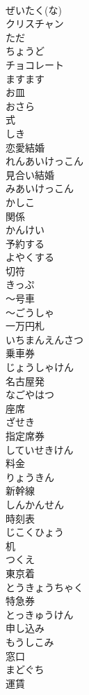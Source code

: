 \documentclass[8pt]{extreport}
\begin{document}
\begin{CJK}{UTF8}{min}
\\	ぜいたく(な)
\\	クリスチャン	
\\	ただ	
\\	ちょうど	
\\	チョコレート	
\\	ますます	
\\	お皿	
\\	おさら
\\	式	
\\	しき
\\	恋愛結婚	
\\	れんあいけっこん
\\	見合い結婚	
\\	みあいけっこん
\\	かしこ	
\\	関係	
\\	かんけい
\\	予約する	
\\	よやくする
\\	切符	
\\	きっぷ
\\	～号車	
\\	～ごうしゃ
\\	一万円札	
\\	いちまんえんさつ
\\	乗車券	
\\	じょうしゃけん
\\	名古屋発	
\\	なごやはつ
\\	座席	
\\	ざせき
\\	指定席券	
\\	していせきけん
\\	料金	
\\	りょうきん
\\	新幹線	
\\	しんかんせん
\\	時刻表	
\\	じこくひょう
\\	机	
\\	つくえ
\\	東京着	
\\	とうきょうちゃく
\\	特急券	
\\	とっきゅうけん
\\	申し込み	
\\	もうしこみ
\\	窓口	
\\	まどぐち
\\	運賃	

\end{CJK}
\end{document}
